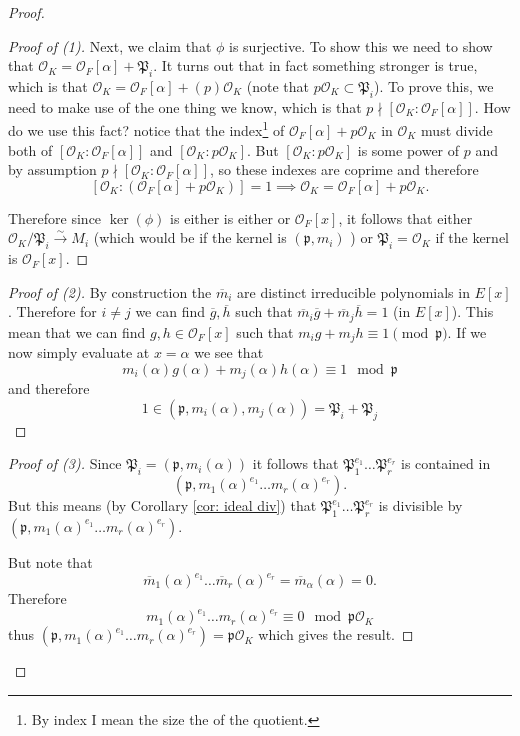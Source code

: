 \documentclass[11pt,a4paper]{report}
\theoremstyle{plain}
\theoremstyle{definition}
\theoremstyle{definition}
\def \gothP{\mathfrak{P}}
\def\gothp{\mathfrak{p}}
\def \a{\alpha}
\def \OO {\mathcal{O}}
\def \ov{\overline}
\def \lra{\longrightarrow}
\begin{document}
\begin{proof}
\begin{proof}[Proof of (1)]
	Next, we claim that $\phi$ is surjective. To show this we need to show that $\OO_K=\OO_F[\a]+\gothP_i$. It turns out that in fact something stronger is true, which is that $\OO_K=\OO_F[\a]+(p)\OO_K$ (note that $p\OO_K \subset \gothP_i$). To prove this, we need to make use of the one thing we know, which is that $p \nmid [\OO_K:\OO_F[\a]]$. How do we use this fact?  notice that the index\footnote{By index I mean the size the of the quotient.} of $\OO_F[\a]+p\OO_K$ in $\OO_K$ must divide both of $[\OO_K:\OO_F[\a]]$ and $[\OO_K:p\OO_K]$. But $[\OO_K:p\OO_K]$ is some power of $p$ and by assumption $p \nmid [\OO_K:\OO_F[\a]]$, so these indexes are coprime and therefore \[[\OO_K: (\OO_F[\a]+p\OO_K)]=1 \implies \OO_K=\OO_F[\a]+p\OO_K.\]
	
	Therefore since $\ker(\phi)$ is either is either  or $\OO_F[x]$, it follows that either  $\OO_K/\gothP_i \overset{\sim}{\lra} M_i$ (which would be if the kernel is $(\gothp,m_i)$ ) or $\gothP_i=\OO_K$ if the kernel is $\OO_F[x]$.
	
	
\end{proof}


\begin{proof}[Proof of (2)]
	By construction the $\ov{m}_i$ are distinct irreducible polynomials in $E[x]$. Therefore for $i \neq j$ we can find $\ov{g},\ov{h}$ such that $\ov{m}_i\ov{g}+\ov{m}_j\ov{h}=1$ (in $E[x]$). This mean that we can find $g,h \in \OO_F[x]$ such that $m_ig+m_jh \equiv 1 \pmod \gothp$. If we now simply evaluate at $x=\a$ we see that \[m_i(\a)g(\a)+m_j(\a)h(\a) \equiv 1 \mod \gothp\] and therefore \[1 \in (\gothp,m_i(\a),m_j(\a))=\gothP_i+\gothP_j\]
	
\end{proof}

\begin{proof}[Proof of (3)]
	Since $\gothP_i=(\gothp,m_i(\a))$ it follows that $\gothP_1^{e_1}\dots\gothP_r^{e_r}$ is contained in \[(\gothp,m_1(\a)^{e_1}\dots m_r(\a)^{e_r}).\] But this means (by Corollary \ref{cor: ideal div}) that $\gothP_1^{e_1}\dots\gothP_r^{e_r}$ is divisible by $(\gothp,m_1(\a)^{e_1}\dots m_r(\a)^{e_r})$.
	
	But note that \[\ov{m}_1(\a)^{e_1}\dots \ov{m}_r(\a)^{e_r}=\ov{m}_\a(\a)=0.\] Therefore \[m_1(\a)^{e_1}\dots m_r(\a)^{e_r} \equiv 0 \mod \gothp\OO_K\] thus $(\gothp,m_1(\a)^{e_1}\dots m_r(\a)^{e_r})=\gothp\OO_K$ which gives the result.
	
\end{proof}


\end{proof}
\end{document}
